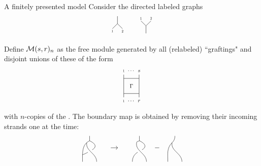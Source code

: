 \documentclass[10pt,t]{beamer} %
\newcommand{\product}{%
	\usebox\preproduct}
\begin{document}
\begin{frame}{A finitely presented model}
	\pause Consider the directed labeled graphs
	\[
	\begin{tikzpicture}[scale=.5]
	\draw (0,0)--(0,.75);
	\draw (0,0)--(.5,-.5);
	\draw (0,0)--(-.5,-.5);
	\node[scale=.5] at (-.5,-.75){1};
	\node[scale=.5] at (.5,-.75){2};
	\end{tikzpicture}
	\qquad
	\begin{tikzpicture}[scale=.5]
	\draw (0,0)--(0,-.75);
	\draw (0,0)--(.5,.5);
	\draw (0,0)--(-.5,.5);
	\node[scale=.5] at (-.5,.75){1};
	\node[scale=.5] at (.5,.75){2};
	\end{tikzpicture}
	\vspace*{-10pt}
	\]

	Define $\mathcal{M}(s, r)_n$ as the free module generated by all (relabeled) ``graftings" and disjoint unions of these of the form
	\[
	\begin{tikzpicture}[scale=.75]
	\draw (-.5,1)--(.5,1)--(.5,0)--(-.5,0)--(-.5,1);
	\node[scale=.75] at (0,.5){$\Gamma$};

	\draw (-.5,1)--(-.5,1.25);
	\node[scale=.5] at (-.5,1.5){1};
	\draw (.5,1)--(.5,1.25);
	\node[scale=.75] at (.5,1.5){$s$};
	\node[scale=.75] at (0,1.5){$\cdots$};

	\draw (-.5,0)--(-.5,-.25);
	\node[scale=.5] at (-.5,-.5){1};
	\draw (.5,0)--(.5,-.25);
	\node[scale=.75] at (.5,-.5){$r$};
	\node[scale=.75] at (0,-.5){$\cdots$};
	\end{tikzpicture}
	\vspace*{-5pt}
	\]
	with $n$-copies of the \product.
	\pause The boundary map is obtained by removing their incoming strands one at the time: \vspace*{-5pt}
	\[
	\begin{tikzpicture}[scale=.35]
	\draw (1,3.7) to (1,3);
	\draw (1,3) to [out=205, in=90] (0,0);
	\draw [shorten >= 0cm] (.6,2.73) to [out=-100, in=90] (2,0);
	\draw [shorten >= .15cm] (1,3) to [out=-25, in=30, distance=1.1cm] (1,1.5);
	\draw [shorten <= .1cm] (1,1.5) to [out=210, in=20] (0,1);

	\draw[->] (4,2) to (5,2);
	\end{tikzpicture}
	\qquad %
	\begin{tikzpicture}[scale=.35]
	\draw (1,3.7) to (1,3);
	\draw (1,3) to [out=205, in=90] (.6,2.73);
	\draw [shorten >= 0cm] (.6,2.73) to [out=-100, in=90] (2,0);
	\draw [shorten >= .15cm] (1,3) to [out=-25, in=30, distance=1.1cm] (1,1.5);
	\draw [shorten <= .1cm] (1,1.5) to [out=210, in=90] (0,0);

	\draw (3.2,2) to (3.8,2);
	\end{tikzpicture}
	\quad %
	\begin{tikzpicture}[scale=.35]
	\draw (1,3.7) to [out=-90, in=45] (.6,2.73);
	\draw (.6,2.73) to [out=225, in=90] (0,0);
	\draw [shorten >= 0cm] (.6,2.73) to [out=-100, in=90] (2,0);
	\end{tikzpicture}
	\]
\end{frame}
\end{document}
